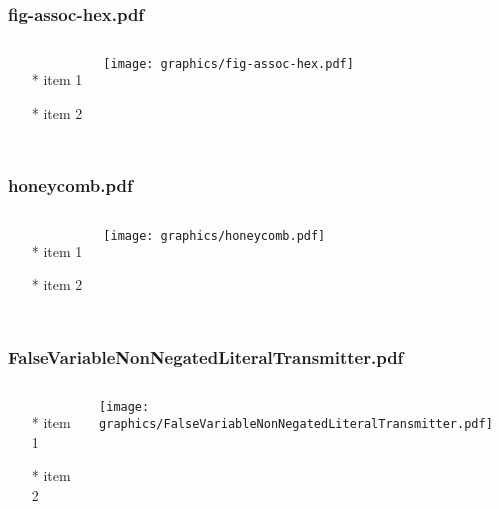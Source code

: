 \documentclass{beamer}
\begin{document}
\begin{frame} \frametitle{fig-assoc-hex.pdf}
    \begin{columns}[c]
        \begin{itemize}
            \item[*] item 1
            \item[*] item 2
        \end{itemize}
        \begin{minipage}{\linewidth}
            \begin{center}
            \texttt{[image: graphics/fig-assoc-hex.pdf]}
            \label{gfx:fig-assoc-hex.pdf}
            \end{center}
        \end{minipage}
    \end{columns}
\end{frame}

\begin{frame} \frametitle{honeycomb.pdf}
    \begin{columns}[c]
        \begin{itemize}
            \item[*] item 1
            \item[*] item 2
        \end{itemize}
        \begin{minipage}{\linewidth}
            \begin{center}
            \texttt{[image: graphics/honeycomb.pdf]}
            \label{gfx:honeycomb.pdf}
            \end{center}
        \end{minipage}
    \end{columns}
\end{frame}

\begin{frame} \frametitle{FalseVariableNonNegatedLiteralTransmitter.pdf}
    \begin{columns}[c]
        \begin{itemize}
            \item[*] item 1
            \item[*] item 2
        \end{itemize}
        \begin{minipage}{\linewidth}
            \begin{center}
            \texttt{[image: graphics/FalseVariableNonNegatedLiteralTransmitter.pdf]}
            \label{gfx:FalseVariableNonNegatedLiteralTransmitter.pdf}
            \end{center}
        \end{minipage}
    \end{columns}
\end{frame}
\end{document}
